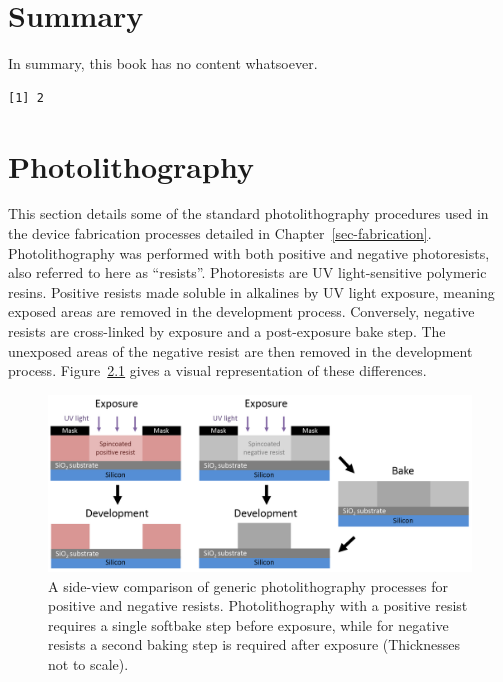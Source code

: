\documentclass[
  a4paper,
]{scrbook}
\begin{document}

\hypertarget{summary}{%
\chapter{Summary}\label{summary}}

In summary, this book has no content whatsoever.

\begin{verbatim}
[1] 2
\end{verbatim}

\appendix
{}

\hypertarget{sec-photolithography}{%
\chapter{Photolithography}\label{sec-photolithography}}

This section details some of the standard photolithography procedures
used in the device fabrication processes detailed in
Chapter~\ref{sec-fabrication}. Photolithography was performed with both
positive and negative photoresists, also referred to here as
``resists''. Photoresists are UV light-sensitive polymeric resins.
Positive resists made soluble in alkalines by UV light exposure, meaning
exposed areas are removed in the development process. Conversely,
negative resists are cross-linked by exposure and a post-exposure bake
step. The unexposed areas of the negative resist are then removed in the
development process. Figure~\ref{fig-photolithography-types} gives a
visual representation of these differences.

\begin{figure}

{\centering \includegraphics{./figures/app1/positive-negative-photolithography.png}

}

\caption{\label{fig-photolithography-types}A side-view comparison of
generic photolithography processes for positive and negative resists.
Photolithography with a positive resist requires a single softbake step
before exposure, while for negative resists a second baking step is
required after exposure \autocite{Microchem} (Thicknesses not to
scale).}

\end{figure}
\end{document}

